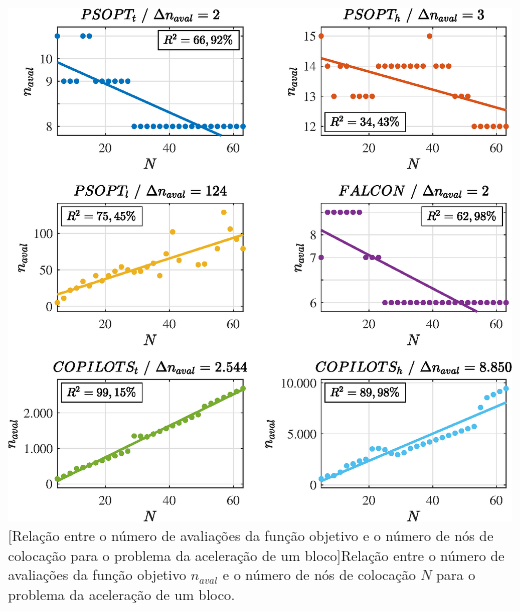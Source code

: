 \noindent
\begin{minipage}{\textwidth}
	\vspace{\onelineskip}
	\centering
	\includegraphics[scale=0.7]{fig/resultados/integrador/sens/eval}
	[Relação entre o número de avaliações da função objetivo e o número de nós de colocação para o problema da aceleração de um bloco]{Relação entre o número de avaliações da função objetivo $ n_{aval} $ e o número de nós de colocação $ N $ para o problema da aceleração de um bloco.}
	\label{fig:integrador:sensibilidade:naval}
	\vspace{\onelineskip}
\end{minipage}